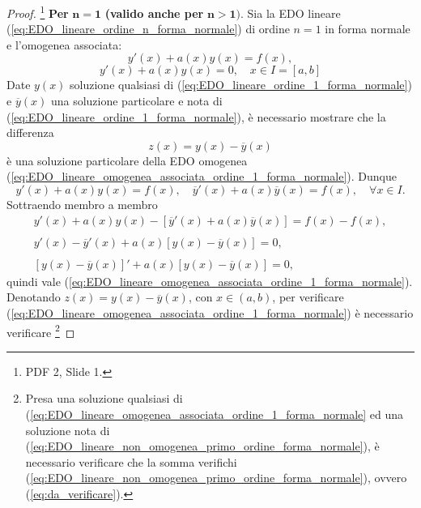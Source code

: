 \begin{proof}\footnote{PDF 2, Slide 1.}
    \textbf{Per} $\boldsymbol{n=1}$ \textbf{(valido anche per} $\boldsymbol{n>1)}$. Sia la EDO lineare (\ref{eq:EDO_lineare_ordine_n_forma_normale}) di ordine $n=1$ in forma normale e l'omogenea associata:
    \begin{equation}\label{eq:EDO_lineare_ordine_1_forma_normale}
        y'(x)+a(x)y(x)=f(x),
    \end{equation}
    \begin{equation}\label{eq:EDO_lineare_omogenea_associata_ordine_1_forma_normale}
        y'(x)+a(x)y(x)=0,\quad x\in I=[a,b]
    \end{equation}
    Date $y(x)$ soluzione qualsiasi di (\ref{eq:EDO_lineare_ordine_1_forma_normale}) e $\overline{y}(x)$ una soluzione particolare e nota di (\ref{eq:EDO_lineare_ordine_1_forma_normale}), è necessario mostrare che la differenza
    \begin{equation*}
        z(x)=y(x)-\overline{y}(x)
    \end{equation*}
    è una soluzione particolare della EDO omogenea (\ref{eq:EDO_lineare_omogenea_associata_ordine_1_forma_normale}). Dunque
    \begin{equation*}
        y'(x)+a(x)y(x)=f(x),\quad \overline{y}'(x) +a(x)\overline{y}(x)=f(x),\quad \forall x\in I.
    \end{equation*}
    Sottraendo membro a membro
    \begin{equation*}
        \begin{matrix}
            y'(x)+a(x)y(x) - [\overline{y}'(x) +a(x)\overline{y}(x)] =f(x)-f(x),\\\\
            y'(x) - \overline{y}'(x)+a(x)[y(x)-\overline{y}(x)]=0,\\\\
            [y(x)-\overline{y}(x)]'+a(x)[y(x)-\overline{y}(x)]=0,
        \end{matrix}
    \end{equation*}
    quindi vale (\ref{eq:EDO_lineare_omogenea_associata_ordine_1_forma_normale}).\\
    Denotando $z(x)=y(x)-\overline{y}(x)$, con $x\in(a,b)$, per verificare (\ref{eq:EDO_lineare_omogenea_associata_ordine_1_forma_normale}) è necessario verificare \footnote{Presa una soluzione qualsiasi di (\ref{eq:EDO_lineare_omogenea_associata_ordine_1_forma_normale} ed una soluzione nota di (\ref{eq:EDO_lineare_non_omogenea_primo_ordine_forma_normale}), è necessario verificare che la somma verifichi (\ref{eq:EDO_lineare_non_omogenea_primo_ordine_forma_normale}), ovvero (\ref{eq:da_verificare}).}

\end{proof}
